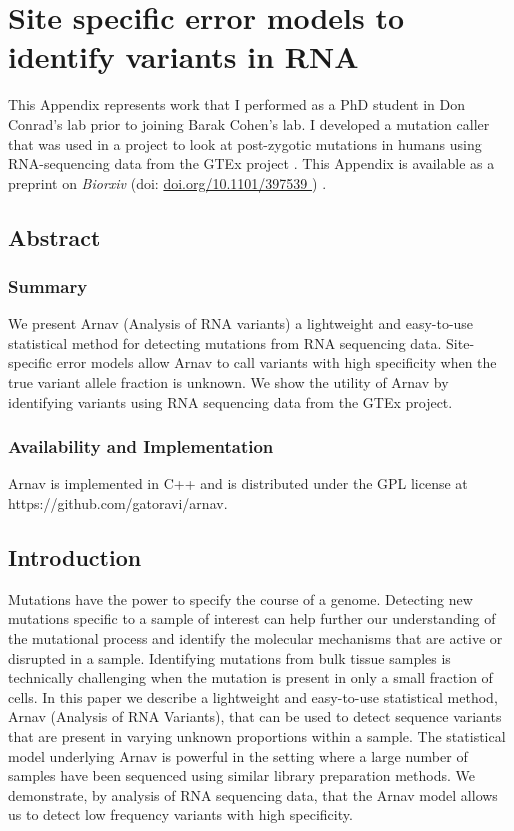 
\chapter{Site specific error models to identify variants in RNA}
\label{chap:appendix A}

\vspace{2in}

This Appendix represents work that I performed as a PhD student in Don Conrad's lab prior to joining Barak Cohen's lab. I developed a mutation caller that was used in a project to look at post-zygotic mutations in humans using RNA-sequencing data from the GTEx project \cite{rockweiler2021a}. This Appendix is available as a preprint on \textit{Biorxiv} (doi: \href{https://www.biorxiv.org/content/10.1101/397539v1}{doi.org/10.1101/397539 }) \cite{ramu2018a}.

\newpage

\section{Abstract}

\subsection{Summary}
We present Arnav (Analysis of RNA variants) a lightweight and easy-to-use statistical method for detecting mutations from RNA sequencing data. Site-specific error models allow Arnav to call variants with high specificity when the true variant allele fraction is unknown. We show the utility of Arnav by identifying variants using RNA sequencing data from the GTEx project.

\subsection{Availability and Implementation} 
Arnav is implemented in C++ and is distributed under the GPL license at https://github.com/gatoravi/arnav.

\section{Introduction}
Mutations have the power to specify the course of a genome. Detecting new mutations specific to a sample of interest can help further our understanding of the mutational process and identify the molecular mechanisms that are active or disrupted in a sample. Identifying mutations from bulk tissue samples is technically challenging when the mutation is present in only a small fraction of cells. In this paper we describe a lightweight and easy-to-use statistical method, Arnav (Analysis of RNA Variants), that can be used to detect sequence variants that are present in varying unknown proportions within a sample. The statistical model underlying Arnav is powerful in the setting where a large number of samples have been sequenced using similar library preparation methods. We demonstrate, by analysis of RNA sequencing data, that the Arnav model allows us to detect low frequency variants with high specificity.

